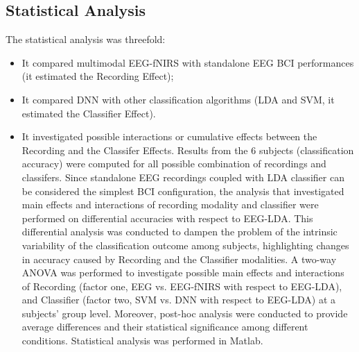 \documentclass[12pt]{iopart}
\begin{document}
\subsection{Statistical Analysis}

The statistical analysis was threefold:
\begin{itemize}
\item It compared multimodal EEG-fNIRS with standalone EEG  BCI performances (it estimated the Recording Effect);
\item It compared DNN with other classification  algorithms (LDA and SVM, it estimated the Classifier Effect).
\item It investigated possible interactions or cumulative effects between the Recording and the Classifer Effects.
Results from the 6 subjects (classification accuracy) were computed for all possible combination of recordings and classifers. 
Since standalone EEG recordings coupled with LDA classifier can be considered the simplest BCI configuration, the analysis that investigated main effects and interactions of recording modality and classifier were performed on differential accuracies with respect to EEG-LDA.
This differential analysis was conducted to dampen the problem of the intrinsic variability of  the classification outcome among subjects, highlighting changes in accuracy caused by  Recording and the Classifier modalities.
A two-way ANOVA was performed to investigate possible main effects and interactions of Recording  (factor one, EEG vs. EEG-fNIRS with respect to EEG-LDA), and  Classifier (factor two, SVM vs. DNN with respect to EEG-LDA) at a subjects' group level.
Moreover, post-hoc analysis were conducted to provide average differences and their statistical significance among different conditions.
Statistical analysis was performed in Matlab.
\end{itemize} 
\end{document}
